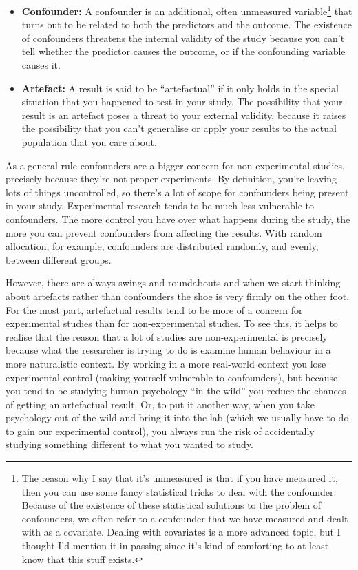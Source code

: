 \documentclass[
  a4paper,
]{book}
\providecommand{\tightlist}{%
  \setlength{\itemsep}{0pt}\setlength{\parskip}{0pt}}\usepackage{longtable,booktabs,array}
\begin{document}
\begin{itemize}
\tightlist
\item
  \textbf{Confounder:} A confounder is an additional, often unmeasured
  variable\footnote{The reason why I say that it's unmeasured is that if
    you have measured it, then you can use some fancy statistical tricks
    to deal with the confounder. Because of the existence of these
    statistical solutions to the problem of confounders, we often refer
    to a confounder that we have measured and dealt with as a covariate.
    Dealing with covariates is a more advanced topic, but I thought I'd
    mention it in passing since it's kind of comforting to at least know
    that this stuff exists.} that turns out to be related to both the
  predictors and the outcome. The existence of confounders threatens the
  internal validity of the study because you can't tell whether the
  predictor causes the outcome, or if the confounding variable causes
  it.
\item
  \textbf{Artefact:} A result is said to be ``artefactual'' if it only
  holds in the special situation that you happened to test in your
  study. The possibility that your result is an artefact poses a threat
  to your external validity, because it raises the possibility that you
  can't generalise or apply your results to the actual population that
  you care about.
\end{itemize}

As a general rule confounders are a bigger concern for non-experimental
studies, precisely because they're not proper experiments. By
definition, you're leaving lots of things uncontrolled, so there's a lot
of scope for confounders being present in your study. Experimental
research tends to be much less vulnerable to confounders. The more
control you have over what happens during the study, the more you can
prevent confounders from affecting the results. With random allocation,
for example, confounders are distributed randomly, and evenly, between
different groups.

However, there are always swings and roundabouts and when we start
thinking about artefacts rather than confounders the shoe is very firmly
on the other foot. For the most part, artefactual results tend to be
more of a concern for experimental studies than for non-experimental
studies. To see this, it helps to realise that the reason that a lot of
studies are non-experimental is precisely because what the researcher is
trying to do is examine human behaviour in a more naturalistic context.
By working in a more real-world context you lose experimental control
(making yourself vulnerable to confounders), but because you tend to be
studying human psychology ``in the wild'' you reduce the chances of
getting an artefactual result. Or, to put it another way, when you take
psychology out of the wild and bring it into the lab (which we usually
have to do to gain our experimental control), you always run the risk of
accidentally studying something different to what you wanted to study.
\end{document}
